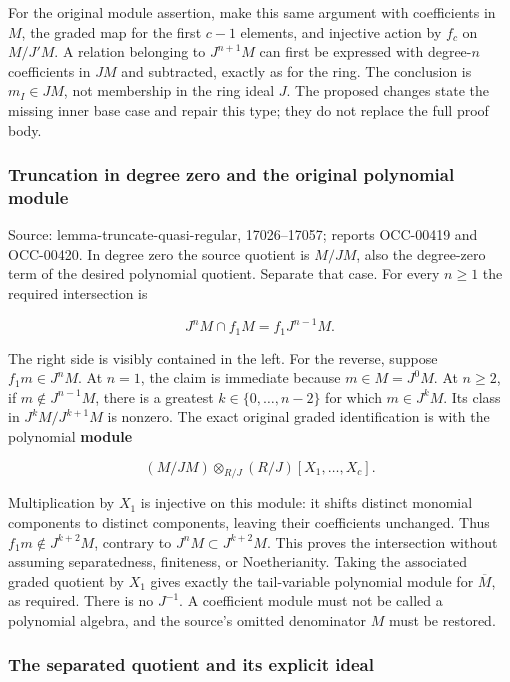 For the original module assertion, make this same argument with coefficients in \(M\), the graded map for the first \(c-1\) elements, and injective action by \(f_c\) on \(M/J'M\). A relation belonging to \(J^{n+1}M\) can first be expressed with degree-\(n\) coefficients in \(JM\) and subtracted, exactly as for the ring. The conclusion is \(m_I\in JM\), not membership in the ring ideal \(J\). The proposed changes state the missing inner base case and repair this type; they do not replace the full proof body.

\subsubsection{Truncation in degree zero and the original polynomial module}\label{truncation-in-degree-zero-and-the-original-polynomial-module}

Source: lemma-truncate-quasi-regular, 17026--17057; reports OCC-00419 and OCC-00420. In degree zero the source quotient is \(M/JM\), also the degree-zero term of the desired polynomial quotient. Separate that case. For every \(n\geq1\) the required intersection is

\[
J^nM\cap f_1M=f_1J^{n-1}M.
\]

The right side is visibly contained in the left. For the reverse, suppose \(f_1m\in J^nM\). At \(n=1\), the claim is immediate because \(m\in M=J^0M\). At \(n\geq2\), if \(m\notin J^{n-1}M\), there is a greatest \(k\in\{0,\ldots,n-2\}\) for which \(m\in J^kM\). Its class in \(J^kM/J^{k+1}M\) is nonzero. The exact original graded identification is with the polynomial \textbf{module}

\[
(M/JM)\otimes_{R/J}(R/J)[X_1,\ldots,X_c].
\]

Multiplication by \(X_1\) is injective on this module: it shifts distinct monomial components to distinct components, leaving their coefficients unchanged. Thus \(f_1m\notin J^{k+2}M\), contrary to \(J^nM\subset J^{k+2}M\). This proves the intersection without assuming separatedness, finiteness, or Noetherianity. Taking the associated graded quotient by \(X_1\) gives exactly the tail-variable polynomial module for \(\overline M\), as required. There is no \(J^{-1}\). A coefficient module must not be called a polynomial algebra, and the source's omitted denominator \(M\) must be restored.

\subsubsection{The separated quotient and its explicit ideal}\label{the-separated-quotient-and-its-explicit-ideal}


